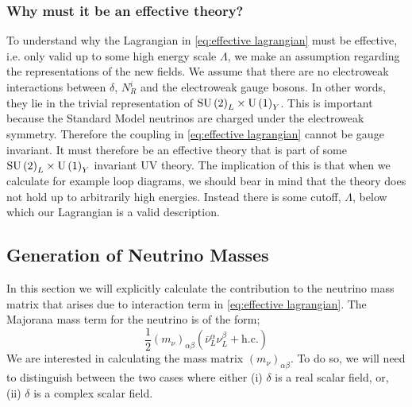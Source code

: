 \documentclass[10pt]{article}
\begin{document}
\subsubsection{Why must it be an effective theory?}\label{sec:why effective}
To understand why the Lagrangian in \eqref{eq:effective lagrangian} must be effective, i.e. only valid up to some high energy scale $\Lambda$, we make an assumption regarding the representations of the new fields. We assume that there are no electroweak interactions between $\delta$, $N^i_R$ and the electroweak gauge bosons. In other words, they lie in the trivial representation of $\textrm{SU}\left(2\right)_L \times \textrm{U}\left(1\right)_Y$. This is important because the Standard Model neutrinos are charged under the electroweak symmetry. Therefore the coupling in \eqref{eq:effective lagrangian} cannot be gauge invariant. It must therefore be an effective theory that is part of some $\textrm{SU}\left(2\right)_L \times \textrm{U}\left(1\right)_Y$ invariant UV theory. The implication of this is that when we calculate for example loop diagrams, we should bear in mind that the theory does not hold up to arbitrarily high energies. Instead there is some cutoff, $\Lambda$, below which our Lagrangian is a valid description.
\subsection{Generation of Neutrino Masses}
In this section we will explicitly calculate the contribution to the neutrino mass matrix that arises due to interaction term in \eqref{eq:effective lagrangian}. The Majorana mass term for the neutrino is of the form;
\begin{equation}\label{eq:neutrino mass}
  \frac{1}{2}(m_\nu)_{\alpha\beta}\left(\bar{\nu}^\alpha_L \nu^\beta_L + \text{h.c.}\right)
\end{equation}
We are interested in calculating the mass matrix $(m_\nu)_{\alpha\beta}$. To do so, we will need to distinguish between the two cases where either (i) $\delta$ is a real scalar field, or, (ii) $\delta$ is a complex scalar field.
\end{document}
